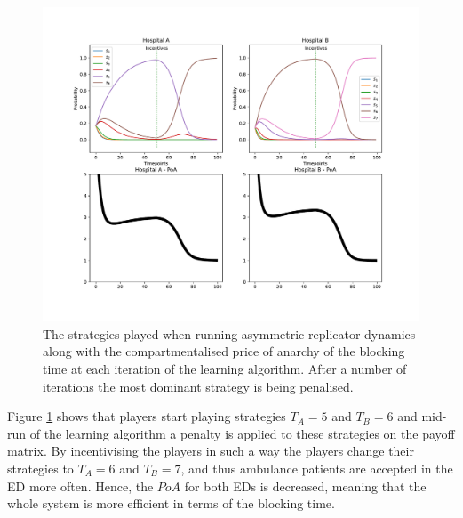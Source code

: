 \begin{figure}[H]
    \includegraphics[width=\textwidth]{imgs/asymmetric_rd_and_PoA/asymmetric_penalty.pdf}
    \caption{
        The strategies played when running asymmetric replicator dynamics
        along with the compartmentalised price of anarchy of the blocking time 
        at each iteration of the learning algorithm. After a number of 
        iterations the most dominant strategy is being penalised.
    }
    \label{fig:ard_penalty}
\end{figure}

Figure \ref{fig:ard_penalty} shows that players start playing strategies 
\( T_A = 5\) and \( T_B = 6 \) and mid-run of the learning algorithm a penalty
is applied to these strategies on the payoff matrix.
By incentivising the players in such a way the players change their strategies 
to \(T_A = 6\) and \(T_B = 7\), and thus ambulance patients are accepted in the 
ED more often.
Hence, the \(PoA\) for both EDs is decreased, meaning that the whole system is
more efficient in terms of the blocking time.
